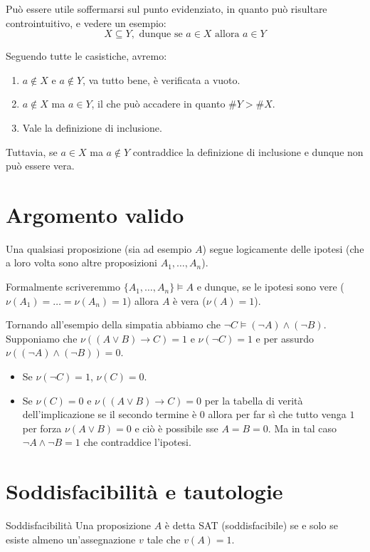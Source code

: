 \documentclass[12pt]{report}
\begin{document}
	Può essere utile soffermarsi sul punto evidenziato, in quanto può risultare controintuitivo, e vedere un esempio:
	\[
	X \subseteq Y, \text{ dunque se } a \in X \text{ allora } a \in Y
	\]
	
	Seguendo tutte le casistiche, avremo:
	\begin{enumerate}
		\item $a \notin X$ e $a \notin Y$, va tutto bene, è verificata a vuoto.
		\item $a \notin X$ ma $a \in Y$, il che può accadere in quanto $\#Y > \#X$.
		\item Vale la definizione di inclusione.
	\end{enumerate}
	
	Tuttavia, se $a \in X$ ma $a \notin Y$ contraddice la definizione di inclusione e dunque non può essere vera.
	
	\section{Argomento valido}
	Una qualsiasi proposizione (sia ad esempio $A$) segue logicamente delle ipotesi (che a loro volta sono altre proposizioni $A_1, \dots, A_n$).
	
	Formalmente scriveremmo $\{A_1, \dots, A_n\} \models A$ e dunque, se le ipotesi sono vere ($\nu(A_1) = \dots = \nu(A_n) = 1$) allora $A$ è vera ($\nu(A) = 1$).
	
	Tornando all'esempio della simpatia abbiamo che $\neg C \models (\neg A) \land (\neg B)$.
	Supponiamo che $\nu((A \lor B) \to C) = 1$ e $\nu(\neg C) = 1$ e per assurdo $\nu((\neg A) \land (\neg B)) = 0$.
	\begin{itemize}
		\item Se $\nu(\neg C) = 1$, $\nu(C) = 0$.
		\item Se $\nu(C) = 0$ e $\nu((A \lor B) \to C) = 0$ per la tabella di verità dell'implicazione se il secondo termine è $0$ allora per far sì che tutto venga $1$ per forza $\nu(A \lor B) = 0$ e ciò è possibile sse $A = B = 0$. Ma in tal caso $\neg A \land \neg B = 1$ che contraddice l'ipotesi.
	\end{itemize}
	
	\section{Soddisfacibilità e tautologie}
	
	\begin{definizione}{Soddisfacibilità}{}
		Una proposizione $A$ è detta SAT (soddisfacibile) se e solo se esiste almeno un'assegnazione $v$ tale che $v(A) = 1$.
	\end{definizione}
	
\end{document}
